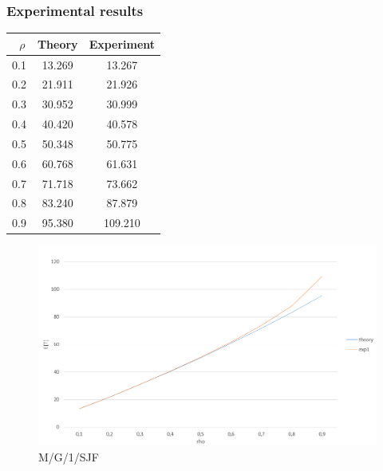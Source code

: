 \documentclass[a4paper]{report}
\begin{document}
\subsubsection*{Experimental results}

\begin{center}
\begin{tabular}{|c|c|c|}

\hline
\ $\rho$ & \textbf{Theory} & \textbf{Experiment}  \\
\hline
0.1 & 13.269 & 13.267  \\
\hline
0.2 & 21.911 & 21.926  \\
\hline
0.3 & 30.952 & 30.999  \\
\hline
0.4 & 40.420 & 40.578  \\
\hline
0.5 & 50.348 &  50.775 \\
\hline
0.6 & 60.768 & 61.631  \\
\hline
0.7 & 71.718 & 73.662  \\
\hline
0.8 & 83.240 & 87.879  \\
\hline
0.9 & 95.380 & 109.210  \\
\hline

\end{tabular}
\end{center}


\begin{figure}[ht]
\begin{center}
\includegraphics[scale=.5]{SJF.PNG}
\end{center}
\caption{M/G/1/SJF}
\end{figure}
\end{document}
